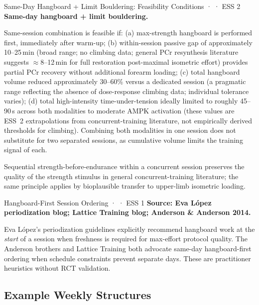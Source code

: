\begin{bioplausbox}{Same-Day Hangboard + Limit Bouldering: Feasibility Conditions · \bioplausible · ESS 2}
\textbf{Same-day hangboard + limit bouldering.}

Same-session combination is feasible if: (a) max-strength hangboard is performed first, immediately after warm-up; (b) within-session passive gap of approximately 10--25\,min (broad range; no climbing data; general PCr resynthesis literature suggests $\approx$8--12\,min for full restoration post-maximal isometric effort) provides partial PCr recovery without additional forearm loading; (c) total hangboard volume reduced approximately 30--60\% versus a dedicated session (a pragmatic range reflecting the absence of dose-response climbing data; individual tolerance varies); (d) total high-intensity time-under-tension ideally limited to roughly 45--90\,s across both modalities to moderate AMPK activation (these values are ESS~2 extrapolations from concurrent-training literature, not empirically derived thresholds for climbing). Combining both modalities in one session does not substitute for two separated sessions, as cumulative volume limits the training signal of each.\singlesource

Sequential strength-before-endurance within a concurrent session preserves the quality of the strength stimulus in general concurrent-training literature; the same principle applies by bioplausible transfer to upper-limb isometric loading.
\end{bioplausbox}

\begin{folklorebox}{Hangboard-First Session Ordering · \folkloreverified · ESS 1}
\textbf{Source: Eva López periodization blog; Lattice Training blog; Anderson \& Anderson 2014.}

Eva López's periodization guidelines explicitly recommend hangboard work at the \emph{start} of a session when freshness is required for max-effort protocol quality. The Anderson brothers and Lattice Training both advocate same-day hangboard-first ordering when schedule constraints prevent separate days. These are practitioner heuristics without RCT validation.
\end{folklorebox}

\subsection{Example Weekly Structures}
\label{subsec:templates}


